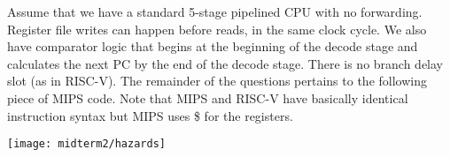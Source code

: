 \begin{blocksection}
\question
Assume that we have a standard 5-stage pipelined CPU with no forwarding. Register file writes can happen before reads, in the same clock cycle. We also have comparator logic that begins at the beginning of the decode stage and calculates the next PC by the end of the decode stage. There is no branch delay slot (as in RISC-V). The remainder of the questions pertains to the following piece of MIPS code. Note that MIPS and RISC-V have basically identical instruction syntax but MIPS uses \$ for the registers.

\texttt{[image: midterm2/hazards]}

\end{blocksection}